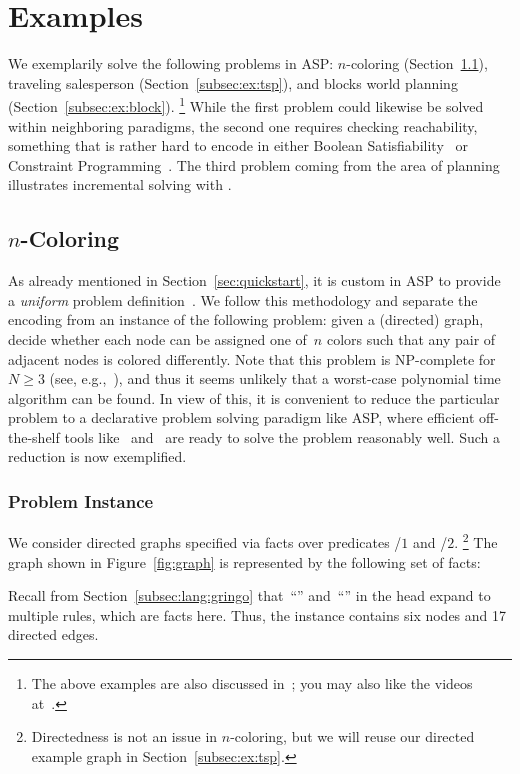 \section{Examples}\label{sec:examples}

We exemplarily solve the following problems in ASP:
$n$-coloring (Section~\ref{subsec:ex:color}),
traveling salesperson (Section~\ref{subsec:ex:tsp}), and
blocks world planning (Section~\ref{subsec:ex:block}).%
\footnote{The above examples are also discussed in~\cite{gekakasc12a};
  you may also like the videos at~\cite{potassco}.}
While the first problem could likewise be solved within neighboring paradigms,
the second one requires checking reachability,
something that is rather hard to encode in either
Boolean Satisfiability~\cite{SATHandbook} or
Constraint Programming~\cite{CPHandbook}.
The third problem coming from the area of planning
illustrates incremental solving with \clingo.

\subsection{\texorpdfstring{$n$}{n}-Coloring}\label{subsec:ex:color}

As already mentioned in Section~\ref{sec:quickstart},
it is custom in ASP to provide a \emph{uniform}
problem definition~\cite{martru99a,niemela99a,schlipf95a}.
We follow this methodology and separate the encoding
from an instance of the following problem:
given a (directed) graph, decide whether each node can be assigned
one of~$n$ colors such that any pair of adjacent nodes is colored differently.
Note that this problem is NP-complete for~$N\geq 3$
(see, e.g.,~\cite{papadimitriou94a}),
and thus it seems unlikely that a worst-case polynomial time algorithm
can be found.
In view of this,
it is convenient to reduce the particular problem to
a declarative problem solving paradigm like ASP,
where efficient off-the-shelf tools like \gringo\ and \clasp\
are ready to solve the problem reasonably well.
Such a reduction is now exemplified.

\subsubsection{Problem Instance}\label{subsec:color:instance}


We consider directed graphs specified via facts over predicates
/$1$ and /$2$.%
\footnote{%
  Directedness is not an issue in $n$-coloring,
  but we will reuse our directed example graph in Section~\ref{subsec:ex:tsp}.}
The graph shown in Figure~\ref{fig:graph} is represented by the following set of facts:
%

%
Recall from Section~\ref{subsec:lang:gringo} that~``'' and~``\code{;}''
in the head expand to multiple rules, which are facts here.
Thus, the instance contains six nodes and 17 directed edges.

